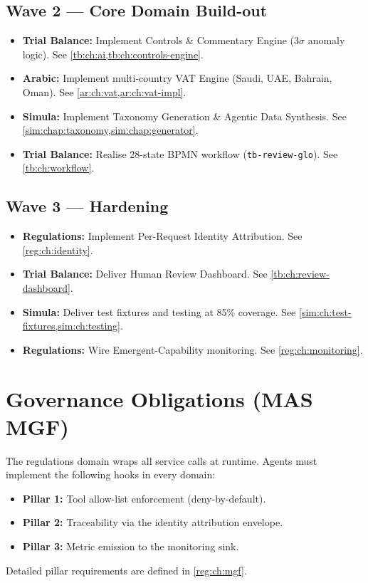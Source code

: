 \documentclass[11pt,a4paper,twoside]{report}
\begin{document}
\subsection*{Wave 2 --- Core Domain Build-out}
\begin{itemize}
\item \textbf{Trial Balance:} Implement Controls \& Commentary Engine (3$\sigma$ anomaly logic). See \cref{tb:ch:ai,tb:ch:controls-engine}.
\item \textbf{Arabic:} Implement multi-country VAT Engine (Saudi, UAE, Bahrain, Oman). See \cref{ar:ch:vat,ar:ch:vat-impl}.
\item \textbf{Simula:} Implement Taxonomy Generation \& Agentic Data Synthesis. See \cref{sim:chap:taxonomy,sim:chap:generator}.
\item \textbf{Trial Balance:} Realise 28-state BPMN workflow (\texttt{tb-review-glo}). See \cref{tb:ch:workflow}.
\end{itemize}

\subsection*{Wave 3 --- Hardening}
\begin{itemize}
\item \textbf{Regulations:} Implement Per-Request Identity Attribution. See \cref{reg:ch:identity}.
\item \textbf{Trial Balance:} Deliver Human Review Dashboard. See \cref{tb:ch:review-dashboard}.
\item \textbf{Simula:} Deliver test fixtures and testing at 85\% coverage. See \cref{sim:ch:test-fixtures,sim:ch:testing}.
\item \textbf{Regulations:} Wire Emergent-Capability monitoring. See \cref{reg:ch:monitoring}.
\end{itemize}

\section{Governance Obligations (MAS MGF)}
The regulations domain wraps all service calls at runtime. Agents must implement the following hooks in every domain:
\begin{itemize}
\item \textbf{Pillar 1:} Tool allow-list enforcement (deny-by-default).
\item \textbf{Pillar 2:} Traceability via the identity attribution envelope.
\item \textbf{Pillar 3:} Metric emission to the monitoring sink.
\end{itemize}
Detailed pillar requirements are defined in \cref{reg:ch:mgf}.
\end{document}
